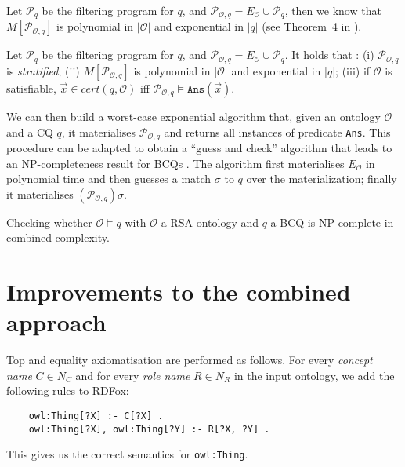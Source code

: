 \documentclass[runningheads]{llncs}
\newcommand{\np}{\textsc{NP}\xspace}
\newcommand{\rdfox}{\mbox{RDFox}\xspace}
\begin{document}
Let $\mathcal{P}_q$ be the filtering program for $q$, and $\mathcal{P}_{\mathcal{O},q} = E_\mathcal{O} \cup \mathcal{P}_q$, then we know that $M[\mathcal{P}_{\mathcal{O},q}]$ is polynomial in $|\mathcal{O}|$ and exponential in $|q|$ (see Theorem~4 in \cite{feier2015}).
 \begin{theorem}
     Let $\mathcal{P}_q$ be the filtering program for $q$, and $\mathcal{P}_{\mathcal{O},q} = E_\mathcal{O} \cup \mathcal{P}_q$.
     It holds that \cite{feier2015}:
         (i) $\mathcal{P}_{\mathcal{O},q}$ is \emph{stratified};
         (ii) $M[\mathcal{P}_{\mathcal{O},q}]$ is polynomial in $|\mathcal{O}|$ and exponential in $|q|$;
         (iii) if $\mathcal{O}$ is satisfiable, $\vec{x} \in cert(q,\mathcal{O})$ iff $\mathcal{P}_{\mathcal{O},q} \models \texttt{Ans}(\vec{x})$.
 \end{theorem}
We can then build a worst-case exponential algorithm that, given an ontology $\mathcal{O}$ and a CQ $q$, it materialises $\mathcal{P}_{\mathcal{O},q}$ and returns all instances of predicate \texttt{Ans}.
This procedure can be adapted to obtain a ``guess and check'' algorithm that leads to an \np-completeness result for BCQs \cite{feier2015}.
The algorithm first materialises $E_\mathcal{O}$ in polynomial time and then guesses a match $\sigma$ to $q$ over the materialization; finally it materialises $(\mathcal{P}_{\mathcal{O},q})\sigma$.

\begin{theorem}
    Checking whether $\mathcal{O} \models q$ with $\mathcal{O}$ a RSA ontology and $q$ a BCQ is \np-complete in combined complexity.
\end{theorem}

\section{Improvements to the combined approach}\label{apx:improvements_to_rsa_combined_approach}

Top and equality axiomatisation are performed as follows.
For every \emph{concept name} $C \in N_C$ and for every \emph{role name} $R \in N_R$ in the input ontology, we add the following rules to \rdfox:

\begin{verbatim}
    owl:Thing[?X] :- C[?X] .
    owl:Thing[?X], owl:Thing[?Y] :- R[?X, ?Y] .
\end{verbatim}

\noindent This gives us the correct semantics for \texttt{owl:Thing}.
\end{document}
